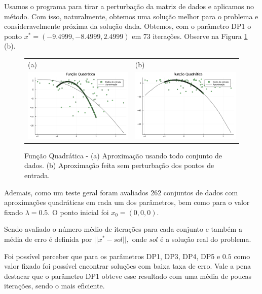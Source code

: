 \documentclass[12pt,a4paper]{article}
\begin{document}
	Usamos o programa para tirar a perturbação da matriz de dados e aplicamos no método. Com isso, naturalmente,  obtemos uma solução melhor para o problema e consideravelmente próxima da solução dada. Obtemos, com o parâmetro DP1 o ponto $x^* = (-9.4999, -8.4999, 2.4999)$ em 73 iterações. Observe na Figura \ref{fig1} (b).
	
		\begin{figure}[H]
		\centering 
		\begin{tabular}{ll}
			
			(a)& (b)   \\
			
			\includegraphics[width=0.45\linewidth]{1.png} & \includegraphics[width=0.45\linewidth]{2.png}\\ 
			
		\end{tabular}
		\caption{Função Quadrática - (a) Aproximação usando todo conjunto de dados. (b) Aproximação feita sem perturbação dos pontos de entrada.}
		\label{fig1}
	\end{figure}


	Ademais, como um teste geral foram avaliados 262 conjuntos de dados com aproximações quadráticas em cada um dos parâmetros, bem como para o valor fixado $\lambda = 0.5.$ O ponto inicial foi $x_0 = (0, 0, 0).$
	
	Sendo avaliado o número médio de iterações para cada conjunto e também a média de erro é definida por $||x^*-sol||,$ onde $sol$ é a solução real do problema.
	
	Foi possível perceber que para os parâmetros DP1, DP3, DP4, DP5 e $0.5$ como valor fixado foi possível encontrar soluções com baixa taxa de erro. Vale a pena destacar que o parâmetro DP1 obteve esse resultado com uma média de poucas iterações, sendo o mais eficiente.
	
\end{document}
